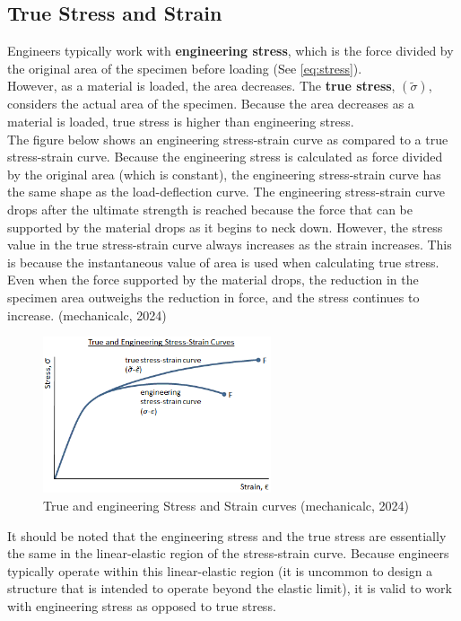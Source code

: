 \documentclass{article}
\begin{document}
    \subsection{True Stress and Strain}
    Engineers typically work with \textbf{engineering stress}, which is the force divided by the original area of the specimen before loading (See \ref{eq:stress}).\\[8pt] However, as a material is loaded, the area decreases. The \textbf{true stress}, $(\tilde{\sigma})$, considers the actual area of the specimen. Because the area decreases as a material is loaded, true stress is higher than engineering stress.\\[8pt]
    The figure below shows an engineering stress-strain curve as compared to a true stress-strain curve. Because the engineering stress is calculated as force divided by the original area (which is constant), the engineering stress-strain curve has the same shape as the load-deflection curve. The engineering stress-strain curve drops after the ultimate strength is reached because the force that can be supported by the material drops as it begins to neck down. However, the stress value in the true stress-strain curve always increases as the strain increases. This is because the instantaneous value of area is used when calculating true stress. Even when the force supported by the material \newpage 
    drops, the reduction in the specimen area outweighs the reduction in force, and the stress continues to increase. (mechanicalc, 2024)    
    \begin{figure}[H]
        \centering
        \includegraphics[width=0.6\textwidth]{images/true-stress-strain-diagram-01.png}
        \caption{True and engineering Stress and Strain curves (mechanicalc, 2024)}
        \label{fig:tvn}
    \end{figure}
    It should be noted that the engineering stress and the true stress are essentially the same in the linear-elastic region of the stress-strain curve. Because engineers typically operate within this linear-elastic region (it is uncommon to design a structure that is intended to operate beyond the elastic limit), it is valid to work with engineering stress as opposed to true stress.\\[8pt]
\end{document}
